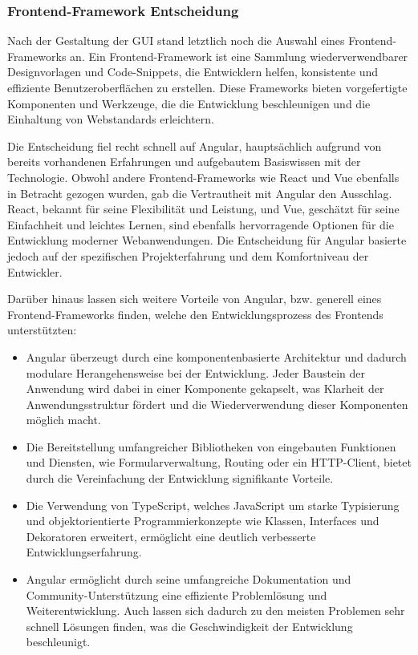 \documentclass[../main.tex]{subfiles} %
\begin{document}
\subsubsection{Frontend-Framework Entscheidung}

Nach der Gestaltung der GUI stand letztlich noch die Auswahl eines Frontend-Frameworks an. Ein Frontend-Framework ist eine Sammlung
wiederverwendbarer Designvorlagen und Code-Snippets, die Entwicklern helfen, konsistente und effiziente Benutzeroberflächen zu
erstellen. Diese Frameworks bieten vorgefertigte Komponenten und Werkzeuge, die die Entwicklung beschleunigen und die Einhaltung
von Webstandards erleichtern.

Die Entscheidung fiel recht schnell auf Angular, hauptsächlich aufgrund von bereits vorhandenen Erfahrungen und aufgebautem
Basiswissen mit der Technologie. Obwohl andere Frontend-Frameworks wie React und Vue ebenfalls in Betracht gezogen wurden,
gab die Vertrautheit mit Angular den Ausschlag. React, bekannt für seine Flexibilität und Leistung, und Vue, geschätzt für
seine Einfachheit und leichtes Lernen, sind ebenfalls hervorragende Optionen für die Entwicklung moderner Webanwendungen. Die
Entscheidung für Angular basierte jedoch auf der spezifischen Projekterfahrung und dem Komfortniveau der Entwickler.

Darüber hinaus lassen sich weitere Vorteile von Angular, bzw. generell eines Frontend-Frameworks finden, welche den Entwicklungsprozess
des Frontends unterstützten:

\begin{itemize}

	\item
	      Angular überzeugt durch eine komponentenbasierte Architektur und dadurch modulare Herangehensweise bei der Entwicklung.
	      Jeder Baustein der Anwendung wird dabei in einer Komponente gekapselt, was Klarheit der Anwendungsstruktur fördert und die
	      Wiederverwendung dieser Komponenten möglich macht.

	\item
	      Die Bereitstellung umfangreicher Bibliotheken von eingebauten Funktionen und Diensten, wie Formularverwaltung, Routing oder
	      ein HTTP-Client, bietet durch die Vereinfachung der Entwicklung signifikante Vorteile.

	\item
	      Die Verwendung von TypeScript, welches JavaScript um starke Typisierung und objektorientierte Programmierkonzepte wie Klassen,
	      Interfaces und Dekoratoren erweitert, ermöglicht eine deutlich verbesserte Entwicklungserfahrung.

	\item
	      Angular ermöglicht durch seine umfangreiche Dokumentation und Community-Unterstützung eine effiziente Problemlösung und
	      Weiterentwicklung. Auch lassen sich dadurch zu den meisten Problemen sehr schnell Lösungen finden, was die Geschwindigkeit der
	      Entwicklung beschleunigt.

\end{itemize}
\end{document}
